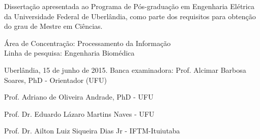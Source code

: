 
\newpage
\thispagestyle{empty}   %
\begin{center}
{\bf \large{\@author}}
\vskip 4cm
{\bf \large{\@titulo}}
\end{center}
\vskip 2cm


\hfill                                                         %
\begin{minipage}{11cm}
Dissertação apresentada ao Programa de Pós-graduação em
Engenharia Elétrica da Universidade Federal de Uberlândia,
como parte dos requisitos para obtenção do grau de Mestre
em Ciências.

\vskip 0.5cm
Área de Concentração: Processamento da Informação \\
Linha de pesquisa: Engenharia Biomédica

\end{minipage}
\vskip 1.5cm
\noindent Uberlândia, 15 de junho de 2015.
\vskip 1cm
\noindent Banca examinadora:
\vskip 0.5cm
Prof. Alcimar Barbosa Soares, PhD - Orientador (UFU)

Prof. Adriano de Oliveira Andrade, PhD - UFU 

Prof. Dr. Eduardo Lázaro Martins Naves - UFU

Prof. Dr. Ailton Luiz Siqueira Dias Jr - IFTM-Ituiutaba

